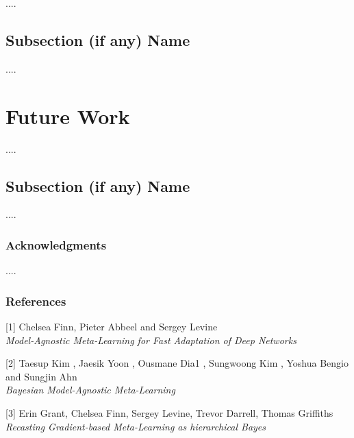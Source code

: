 \documentclass{article} %
\begin{document}
....

\subsection{Subsection (if any) Name}

....

\section{Future Work}

....

\subsection{Subsection (if any) Name}

....

\subsubsection*{Acknowledgments}

....

\subsubsection*{References}

\small{
[1] Chelsea Finn, Pieter Abbeel and Sergey Levine\\
\textit{Model-Agnostic Meta-Learning for Fast Adaptation of Deep Networks}

[2] Taesup Kim
, Jaesik Yoon
, Ousmane Dia1
, Sungwoong Kim
,
Yoshua Bengio
and Sungjin Ahn\\
\textit{Bayesian Model-Agnostic Meta-Learning}

[3] Erin Grant, Chelsea Finn, Sergey Levine, Trevor Darrell, Thomas Griffiths\\
\textit{Recasting Gradient-based Meta-Learning as
hierarchical Bayes}
}
\end{document}
